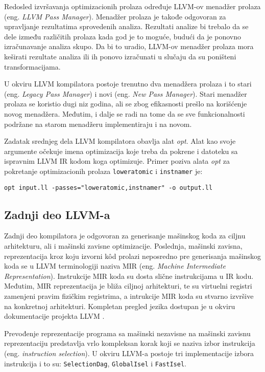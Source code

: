 \documentclass[12pt,oneside]{memoir}
\begin{document}
Redosled izvršavanja optimizacionih prolaza određuje LLVM-ov menadžer prolaza (eng. \textit{LLVM Pass Manager}). Menadžer prolaza je takođe odgovoran za upravljanje rezultatima sprovedenih analiza. Rezultati analize bi trebalo da se dele između različitih prolaza kada god je to moguće, budući da je ponovno izračunavanje analiza skupo. Da bi to uradio, LLVM-ov menadžer prolaza mora keširati rezultate analiza ili ih ponovo izračunati u slučaju da su poništeni transformacijama. 

U okviru LLVM kompilatora postoje trenutno dva menadžera prolaza i to stari (eng. \textit{Legacy Pass Manager}) i novi (eng. \textit{New Pass Manager}). Stari menadžer prolaza se koristio dugi niz godina, ali se zbog efikasnosti prešlo na korišćenje novog menadžera. Međutim, i dalje se radi na tome da se sve funkcionalnosti podržane na starom menadžeru implementiraju i na novom. 

Zadatak srednjeg dela LLVM kompilatora obavlja alat \textit{opt}. Alat kao svoje argumente očekuje imena optimizacija koje treba da pokrene i datoteku sa ispravnim LLVM IR kodom koga optimizuje. Primer poziva alata \textit{opt} za pokretanje optimizacionih prolaza \texttt{loweratomic} i \texttt{instnamer} je:

\begin{verbatim}
opt input.ll -passes="loweratomic,instnamer" -o output.ll
\end{verbatim}

\subsection{Zadnji deo LLVM-a}
Zadnji deo kompilatora je odgovoran za generisanje mašinskog koda za ciljnu arhitekturu, ali i mašinski zavisne optimizacije. Poslednja, mašinski zavisna, reprezentacija kroz koju izvorni k\^od prolazi neposredno pre generisanja mašinskog koda se u LLVM terminologiji naziva MIR (eng. \textit{Machine Intermediate Representation}). Instrukcije MIR koda su dosta slične instrukcijama u IR kodu. Međutim, MIR reprezentacija je bliža ciljnoj arhitekturi, te su virtuelni registri zamenjeni pravim fizičkim registrima, a intrukcije MIR koda su stvarno izvršive na konkretnoj arhitekturi. Kompletan pregled jezika dostupan je u okviru dokumentacije projekta LLVM \cite{mir_documentation}.

Prevođenje reprezentacije programa sa mašinski nezavisne na mašinski zavisnu reprezentaciju predstavlja vrlo kompleksan korak koji se naziva izbor instrukcija (eng. \textit{instruction selection}). U okviru LLVM-a postoje tri implementacije izbora instrukcija i to su: \texttt{SelectionDag}, \texttt{GlobalIsel} i \texttt{FastIsel}.
\end{document}

